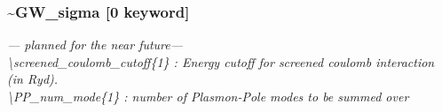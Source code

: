 \documentclass[letterpaper,12pt]{article}
\newcommand{\note}[1]{{\bf \large \color{red} #1}}
\newcommand{\red}{\color{red}}
\newcommand{\black}{\color{black}}
\begin{document}
\newpage
\subsubsection*{\bf \~{}GW\_sigma [0 keyword]}




 {\it
 --- planned for the near future---\\
\textbackslash{}screened\_coulomb\_cutoff\{1\} : Energy cutoff for screened coulomb interaction (in Ryd).\\
\textbackslash{}PP\_num\_mode\{1\} : number of Plasmon-Pole modes to be summed over\\
}




\newpage
\end{document}

